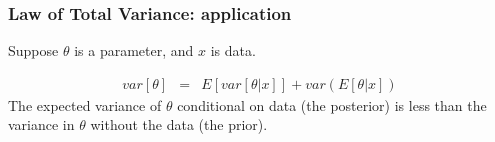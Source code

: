 \documentclass[handout]{beamer}
\numberwithin{equation}{section}
\begin{document}
\begin{frame}
\frametitle{Law of Total Variance: application}
Suppose $\theta$ is a parameter, and $x$ is data.

\begin{eqnarray}
var[\theta] & = & E[var[\theta|x]]+var(E[\theta|x]) \nonumber 
\end{eqnarray}
The expected variance of $\theta$ conditional on data (the posterior) is less than the variance in $\theta$ without the data (the prior).
\end{frame}
\end{document}
